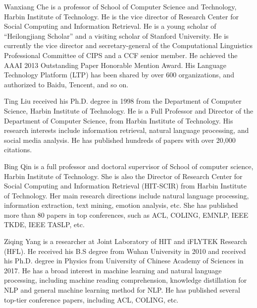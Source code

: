 \documentclass[journal]{IEEEtran}
\begin{document}
\begin{CJK*}{UTF8}{gbsn}
\begin{IEEEbiography}{Wanxiang Che}
is a professor of School of Computer Science and Technology, Harbin Institute of Technology. He is the vice director of Research Center for Social Computing and Information Retrieval. He is a young scholar of “Heilongjiang Scholar” and a visiting scholar of Stanford University. He is currently the vice director and secretary-general of the Computational Linguistics Professional Committee of CIPS and a CCF senior member. He achieved the AAAI 2013 Outstanding Paper Honorable Mention Award. His Language Technology Platform (LTP) has been shared by over 600 organizations, and authorized to Baidu, Tencent, and so on. 
\end{IEEEbiography}


\begin{IEEEbiography}{Ting Liu}
received his Ph.D. degree in 1998 from the Department of Computer Science, Harbin Institute of Technology. 
He is a Full Professor and Director of the Department of Computer Science, from Harbin Institute of Technology. 
His research interests include information retrieval, natural language processing, and social media analysis.
He has published hundreds of papers with over 20,000 citations.
\end{IEEEbiography}


\begin{IEEEbiography}{Bing Qin}
is a full professor and doctoral supervisor of School of computer science, Harbin Institute of Technology. 
She is also the Director of Research Center for Social Computing and Information Retrieval (HIT-SCIR) from Harbin Institute of Technology.
Her main research directions include natural language processing, information extraction, text mining, emotion analysis, etc. She has published more than 80 papers in top conferences, such as ACL, COLING, EMNLP, IEEE TKDE, IEEE TASLP, etc. 
\end{IEEEbiography}


\begin{IEEEbiography}{Ziqing Yang}
is a researcher at Joint Laboratory of HIT and iFLYTEK Research (HFL). He received his B.S degree from Wuhan University in 2010 and received his Ph.D. degree in Physics from University of Chinese Academy of Sciences in 2017. He has a broad interest in machine learning and natural language processing, including machine reading comprehension, knowledge distillation for NLP and general machine learning method for NLP. He has published several top-tier conference papers, including ACL, COLING, etc.
\end{IEEEbiography}















\end{CJK*}
\end{document}

